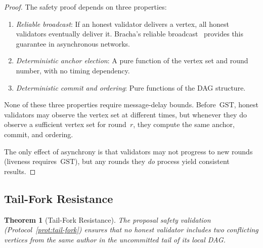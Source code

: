 \documentclass[11pt,a4paper]{article}
\newtheorem{theorem}{Theorem}[section]
\theoremstyle{definition}
\theoremstyle{remark}
\newcommand{\GST}{\mathrm{GST}}
\begin{document}
\begin{proof}
The safety proof depends on three properties:
\begin{enumerate}[nosep]
  \item \emph{Reliable broadcast}: If an honest validator delivers a vertex,
    all honest validators eventually deliver it.
    Bracha's reliable broadcast~\cite{bracha1987asynchronous} provides this
    guarantee in asynchronous networks.
  \item \emph{Deterministic anchor election}: A pure function of the vertex
    set and round number, with no timing dependency.
  \item \emph{Deterministic commit and ordering}: Pure functions of the DAG
    structure.
\end{enumerate}
None of these three properties require message-delay bounds.
Before~$\GST$, honest validators may observe the vertex set at different
times, but whenever they do observe a sufficient vertex set for round~$r$,
they compute the same anchor, commit, and ordering.

The only effect of asynchrony is that validators may not progress to new
rounds (liveness requires~$\GST$), but any rounds they \emph{do} process
yield consistent results.
\end{proof}

\subsection{Tail-Fork Resistance}

\begin{theorem}[Tail-Fork Resistance]\label{thm:tail-fork}
The proposal safety validation (Protocol~\ref{prot:tail-fork}) ensures
that no honest validator includes two conflicting vertices from the same
author in the uncommitted tail of its local DAG.
\end{theorem}
\end{document}
